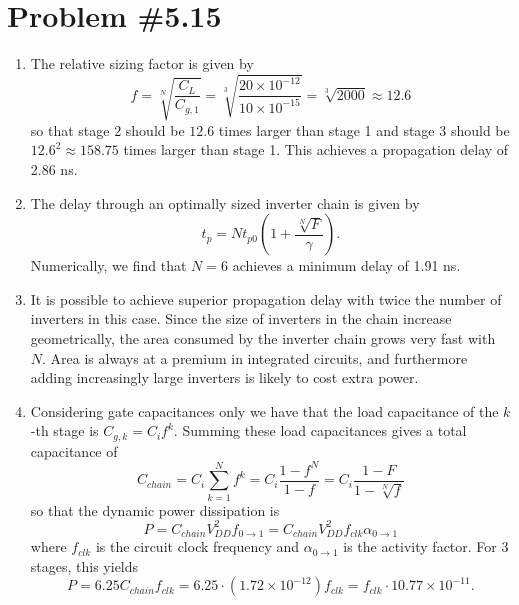 \documentclass{article}
\begin{document}
\section*{Problem \#5.15}
\begin{enumerate}[label=(\alph*)]
  \item{
    The relative sizing factor is given by
    $$
      f 
    = \sqrt[N]{\frac{C_L}{C_{g,1}}} 
    = \sqrt[3]{\frac{20 \times 10^{-12}}{10 \times 10^{-15}}}
    = \sqrt[3]{2000}
    \approx 12.6
    $$
    so that stage 2 should be $12.6$ times larger than stage 1 and
    stage 3 should be $12.6^2 \approx 158.75$ times larger than stage 1.
    This achieves a propagation delay of 2.86 ns.
  }
  \item{
    The delay through an optimally sized inverter chain is given by
    $$
    t_p = N t_{p0} \left(1 + \frac{\sqrt[N]{F}}{\gamma}\right).
    $$
    Numerically, we find that $N = 6$ achieves a minimum delay 
    of 1.91 ns.
  }
  \item{
    It is possible to achieve superior propagation delay with twice the
    number of inverters in this case.
    Since the size of inverters in the chain increase geometrically,
    the area consumed by the inverter chain grows very fast with $N$.
    Area is always at a premium in integrated circuits, and furthermore
    adding increasingly large inverters is likely to cost extra power.
  }
  \item{
    Considering gate capacitances only we have that the load capacitance
    of the $k$-th stage is $C_{g,k} = C_i f^k$. Summing
    these load capacitances gives a total capacitance of
    $$
      C_{chain}
    = C_i \sum_{k=1}^{N} f^k
    = C_i \frac{1 - f^{N}}{1 - f}
    = C_i \frac{1 - F}{1 - \sqrt[N]{f}}
    $$
    so that the dynamic power dissipation is
    $$
      P 
    = C_{chain} V_{DD}^2 f_{0 \to 1}
    = C_{chain} V_{DD}^2 f_{clk} \alpha_{0 \to 1}
    $$
    where $f_{clk}$ is the circuit clock frequency and
    $\alpha_{0 \to 1}$ is the activity factor.
    For 3 stages, this yields
    $$
      P
    = 6.25 C_{chain} f_{clk}
    = 6.25 \cdot (1.72 \times 10^{-12}) f_{clk}
    = f_{clk} \cdot 10.77 \times 10^{-11}.
    $$
  }
\end{enumerate}
\end{document}
